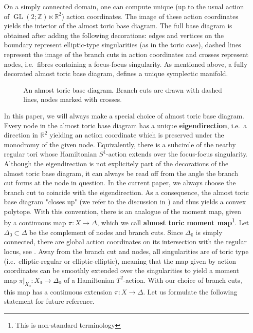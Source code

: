 \documentclass[12pt,a4paper,draft]{scrartcl}
\begin{document}
On a simply connected domain, one can compute unique (up to the usual action of $\operatorname{GL}(2;\mathbb{Z}) \ltimes \mathbb{R}^2$) action coordinates.
The image of these action coordinates yields the interior of the almost toric base diagram.
The full base diagram is obtained after adding the following decorations: edges and vertices on the boundary represent elliptic-type singularities (as in the toric case), dashed lines represent the image of the branch cuts in action coordinates and crosses represent nodes, i.e.\ fibres containing a focus-focus singularity.
As mentioned above, a fully decorated almost toric base diagram, defines a unique symplectic manifold.

\begin{figure}
  \centering
  \caption{An almost toric base diagram.
Branch cuts are drawn with dashed lines, nodes marked with crosses.}
  \label{fig:atf_example}
\end{figure}

In this paper, we will always make a special choice of almost toric base diagram.
Every node in the almost toric base diagram has a unique \textbf{eigendirection}, i.e.\ a direction in $\mathbb{R}^2$ yielding an action coordinate which is preserved under the monodromy of the given node.
Equivalently, there is a subcircle of the nearby regular tori whose Hamiltonian $S^1$-action extends over the focus-focus singularity.
Although the eigendirection is not explicitely part of the decorations of the almost toric base diagram, it can always be read off from the angle the branch cut forms at the node in question.
In the current paper, we always choose the branch cut to coincide with the eigendirection.
As a consequence, the almost toric base diagram "closes up" (we refer to the discussion in \cite[Section 7.2]{evans2021atfs}) and thus yields a convex polytope.
With this convention, there is an analogue of the moment map, given by a continuous map $\pi \colon X \rightarrow \Delta$, which we call \textbf{almost toric moment map}\footnote{This is non-standard terminology}.
Let $\Delta_0 \subset \Delta$ be the complement of nodes and branch cuts.
Since $\Delta_0$ is simply connected, there are global action coordinates on its intersection with the regular locus, see \cite{Dui80}.
Away from the branch cut and nodes, all singularities are of toric type (i.e.\ elliptic-regular or elliptic-elliptic), meaning that the map given by action coordinates can be smoothly extended over the singularities to yield a moment map $\pi\vert_{X_0} \colon X_0 \rightarrow \Delta_0$ of a Hamiltonian $T^2$-action.
With our choice of branch cuts, this map has a continuous extension $\pi \colon X \rightarrow \Delta$.
Let us formulate the following statement for future reference.
\end{document}
